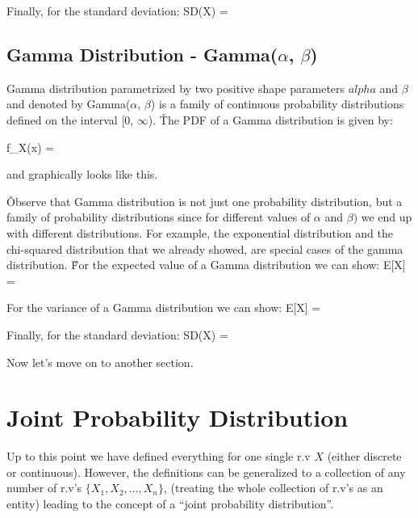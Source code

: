 Finally, for the standard deviation:
\bse
SD(X) = 
\ese

\subsection{Gamma Distribution - Gamma($\alpha$, $\beta$)}

Gamma distribution parametrized by two positive shape parameters $alpha$ and $\beta$ and denoted by Gamma($\alpha$,
$\beta$) is a family of continuous probability distributions defined on the interval [0, $\infty$). \v

The PDF of a Gamma distribution is given by:

\bse
f_{X}(x) = 
\ese
\ed

and graphically looks like this.


\v

Observe that Gamma distribution is not just one probability distribution, but a family of probability distributions
since for different values of $\alpha$ and $\beta)$ we end up with different distributions. For example, the
exponential distribution and the chi-squared distribution that we already showed, are special cases of the gamma
distribution. \v

For the expected value of a Gamma distribution we can show:
\bse
E[X] = \frac{\alpha}{\beta}
\ese

For the variance of a Gamma distribution we can show:
\bse
E[X] = 
\ese

Finally, for the standard deviation:
\bse
SD(X) = \frac{\sqrt{\alpha}}{\beta}
\ese

Now let's move on to another section.

\section{Joint Probability Distribution}

Up to this point we have defined everything for one single r.v $X$ (either discrete or continuous). However, the
definitions can be generalized to a collection of any number of r.v's $\{ X_{1}, X_{2}, \ldots, X_{n} \}$, (treating
the whole collection of r.v's as an entity) leading to the concept of a ``joint probability distribution''.

